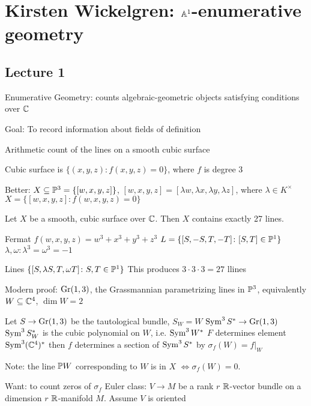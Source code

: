 \newpage
\section{Kirsten Wickelgren: $\A^1$-enumerative geometry}
\subsection{Lecture 1}

Enumerative Geometry: counts algebraic-geometric objects satisfying conditions over $\C$

Goal: To record information about fields of definition

Arithmetic count of the lines on a smooth cubic surface

\begin{dfn}
Cubic surface is $\{ (x,y,z) \colon f(x,y,z)=0 \}$, where $f$ is degree 3
\end{dfn}


Better: $X \subseteq \P^3= \{ [w,x,y,z] \}$, $[w,x,y,z]= [\lambda w,\lambda x, \lambda y, \lambda z]$, where $\lambda \in K^\times$
$X= \{[w,x,y,z] \colon f(w,x,y,z)=0\}$

\begin{thm}
Let $X$ be a smooth, cubic surface over $\C$. Then $X$ contains exactly 27 lines.
\end{thm}


\begin{ex}
Fermat
$f(w,x,y,z)= w^3+x^3+y^3+z^3$
$L= \{[S,-S,T,-T] \colon [S,T] \in \P^1\}$
$\lambda,\omega: \lambda^3=\omega^3= -1$

Lines $\{ [S,\lambda S,T,\omega T] \colon S,T \in \P^1\}$
This produces $3 \cdot 3 \cdot 3= 27$ llines
\end{ex}


Modern proof: $\gr(1,3)$, the Grassmannian parametrizing lines in $\P^3$, equivalently $W \subseteq \C^4$, $\dim W=2$

Let $S \to \gr(1,3)$ be the tautological bundle, $S_W= W$
$\sym^3 S^* \to \gr(1,3)$
$\sym^3S^*_W$ is the cubic polynomial on $W$, i.e. $\sym^3 W^*$
$F$ determines element $\sym^3(\C^4)^*$ then $f$ determines a section of $\sym^3S^*$ by $\sigma_f(W)= f\big|_W$

Note: the line $\P W$ corresponding to $W$ is in $X$ $\Leftrightarrow \sigma_f(W)=0$.

Want: to count zeros of $\sigma_f$
Euler class: $V \to M$ be a rank $r$ $\R$-vector bundle on a dimension $r$ $\R$-manifold $M$. Assume $V$ is oriented 

